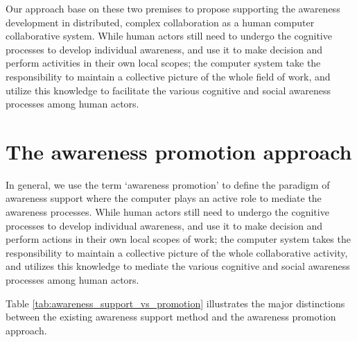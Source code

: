 Our approach base on these two premises to propose supporting the awareness development in distributed, complex collaboration as a human computer collaborative system. While human actors still need to undergo the cognitive processes to develop individual awareness, and use it to make decision and perform activities in their own local scopes; the computer system take the responsibility to maintain a collective picture of the whole field of work, and utilize this knowledge to facilitate the various cognitive and social awareness processes among human actors.

\section{The awareness promotion approach} %
\label{sec:awareness_promotion_approach}
In general, we use the term `awareness promotion' to define the paradigm of awareness support where the computer plays an active role to mediate the awareness processes. While human actors still need to undergo the cognitive processes to develop individual awareness, and use it to make decision and perform actions in their own local scopes of work; the computer system takes the responsibility to maintain a collective picture of the whole collaborative activity, and utilizes this knowledge to mediate the various cognitive and social awareness processes among human actors.

Table \ref{tab:awareness_support_vs_promotion} illustrates the major distinctions between the existing awareness support method and the awareness promotion approach.

